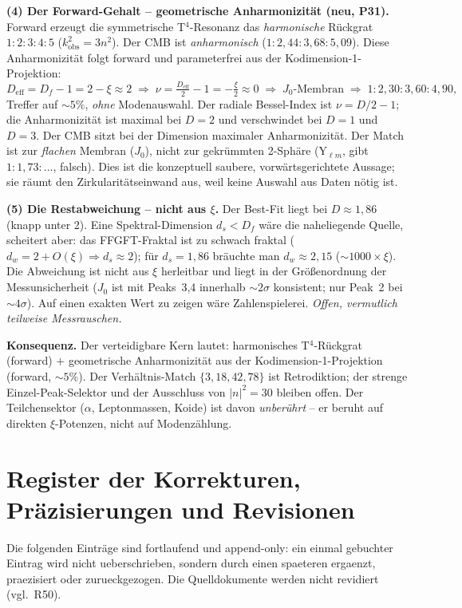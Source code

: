 \textbf{(4) Der Forward-Gehalt -- geometrische Anharmonizität (neu, P31).}
Forward erzeugt die symmetrische T$^4$-Resonanz das \emph{harmonische}
Rückgrat $1:2:3:4:5$ ($k^2_\mathrm{obs}=3n^2$). Der CMB ist
\emph{anharmonisch} ($1:2{,}44:3{,}68:5{,}09$). Diese Anharmonizität folgt
forward und parameterfrei aus der Kodimension-1-Projektion:
\[
  D_\mathrm{eff}=D_f-1=2-\xi\approx2
  \;\Rightarrow\;
  \nu=\tfrac{D_\mathrm{eff}}{2}-1=-\tfrac{\xi}{2}\approx0
  \;\Rightarrow\;
  J_0\text{-Membran}
  \;\Rightarrow\;
  1:2{,}30:3{,}60:4{,}90,
\]
Treffer auf $\sim5\%$, \emph{ohne} Modenauswahl. Der radiale Bessel-Index
ist $\nu=D/2-1$; die Anharmonizität ist maximal bei $D=2$ und verschwindet
bei $D=1$ und $D=3$. Der CMB sitzt bei der Dimension maximaler
Anharmonizität. Der Match ist zur \emph{flachen} Membran ($J_0$), nicht zur
gekrümmten 2-Sphäre (Y$_{\ell m}$, gibt $1:1{,}73:\ldots$, falsch). Dies ist
die konzeptuell saubere, vorwärtsgerichtete Aussage; sie räumt den
Zirkularitätseinwand aus, weil keine Auswahl aus Daten nötig ist.

\textbf{(5) Die Restabweichung -- nicht aus $\xi$.}
Der Best-Fit liegt bei $D\approx1{,}86$ (knapp unter 2). Eine
Spektral-Dimension $d_s<D_f$ wäre die naheliegende Quelle, scheitert aber:
das FFGFT-Fraktal ist zu schwach fraktal ($d_w=2+O(\xi)\Rightarrow
d_s\approx2$); für $d_s=1{,}86$ bräuchte man $d_w\approx2{,}15$
($\sim1000\times\xi$). Die Abweichung ist nicht aus $\xi$ herleitbar und
liegt in der Größenordnung der Messunsicherheit ($J_0$ ist mit Peaks~3,4
innerhalb $\sim2\sigma$ konsistent; nur Peak~2 bei $\sim4\sigma$). Auf einen
exakten Wert zu zeigen wäre Zahlenspielerei. \emph{Offen, vermutlich
teilweise Messrauschen.}

\textbf{Konsequenz.} Der verteidigbare Kern lautet: harmonisches
T$^4$-Rückgrat (forward) $+$ geometrische Anharmonizität aus der
Kodimension-1-Projektion (forward, $\sim5\%$). Der Verhältnis-Match
$\{3,18,42,78\}$ ist Retrodiktion; der strenge Einzel-Peak-Selektor und der
Ausschluss von $|n|^2=30$ bleiben offen. Der Teilchensektor ($\alpha$,
Leptonmassen, Koide) ist davon \emph{unberührt} -- er beruht auf direkten
$\xi$-Potenzen, nicht auf Modenzählung.



\section{Register der Korrekturen, Präzisierungen und Revisionen}

\noindent Die folgenden Einträge sind fortlaufend und append-only: ein einmal gebuchter Eintrag wird nicht ueberschrieben, sondern durch einen spaeteren ergaenzt, praezisiert oder zurueckgezogen. Die Quelldokumente werden nicht revidiert (vgl.\ R50).



